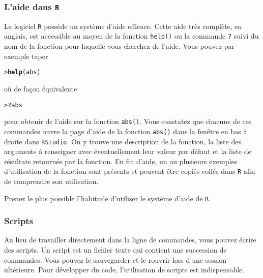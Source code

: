 \documentclass[11pt]{article}
\makeatletter
\numberwithin{equation}{section}
\theoremstyle{remark}
\newenvironment{kframe}{%
 \def\at@end@of@kframe{}%
 \ifinner\ifhmode%
  \def\at@end@of@kframe{\end{minipage}}%
  \begin{minipage}{\columnwidth}%
 \fi\fi%
 \def\FrameCommand##1{\hskip\@totalleftmargin \hskip-\fboxsep
 \colorbox{shadecolor}{##1}\hskip-\fboxsep
     \hskip-\linewidth \hskip-\@totalleftmargin \hskip\columnwidth}%
 \MakeFramed {\advance\hsize-\width
   \@totalleftmargin\z@ \linewidth\hsize
   \@setminipage}}%
 {\par\unskip\endMakeFramed%
 \at@end@of@kframe}
\newenvironment{knitrout}{}{}
\newcommand{\hlopt}[1]{\textcolor[rgb]{0,0,0}{#1}}%
\newcommand{\hlstd}[1]{\textcolor[rgb]{0,0.2,0.4}{#1}}%
\newcommand{\hlkwd}[1]{\textcolor[rgb]{0.76,0.13,0.28}{\textbf{#1}}}%
\makeatother
\begin{document}
\subsubsection{L'aide dans   \texttt R}   
Le logiciel  \texttt R  poss\`ede un syst\`eme d'aide efficace. 
Cette aide très complète, en anglais, est accessible au moyen de la fonction
\texttt{help()} ou la commande \texttt{?} suivi du nom de la fonction pour laquelle vous cherchez de l'aide.
Vous pouvez par exemple taper
\begin{knitrout}
\color{fgcolor}\begin{kframe}
\begin{alltt}
\hlstd{> }\hlkwd{help}\hlstd{(abs)}
\end{alltt}
\end{kframe}
\end{knitrout}
où de façon équivalente
\begin{knitrout}
\color{fgcolor}\begin{kframe}
\begin{alltt}
\hlstd{> }\hlopt{?}\hlstd{abs}
\end{alltt}
\end{kframe}
\end{knitrout}
 pour obtenir de l'aide sur la fonction \texttt{abs()}.
Vous constatez que chacune de ces commandes ouvre la page d'aide de la fonction \texttt{abs()} dans la fenêtre en bas à droite dans \texttt{RStudio}.
On y trouve une description de la fonction, la liste des arguments à renseigner avec  éventuellement leur valeur par défaut et la liste de résultats retournée par la fonction. En fin d'aide, un ou plusieurs exemples d'utilisation de la fonction sont présents et peuvent être copiés-collés dans \texttt{R} afin de comprendre son utilisation.

Prenez le plus possible l'habitude d'utiliser le système d'aide de
\texttt R.




\subsubsection{Scripts}
Au lieu de travailler directement dans la ligne de commandes, vous pouvez  écrire des scripts. Un script est un fichier texte qui contient  une succession de commandes. Vous pouvez le sauvegarder et le rouvrir lors d'une session ultérieure. 
Pour développer du code, l'utilisation de scripts  est indispensable. 
\end{document}
